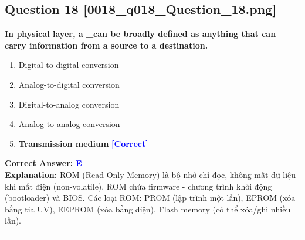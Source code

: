 \documentclass[11pt,a4paper]{article}
\begin{document}
\begin{minipage}{\textwidth}
\subsection*{Question 18 \quad \footnotesize{[0018\_q018\_Question\_18.png]}}
\noindent \textbf{In physical layer, a \_can be broadly defined as anything that can carry information from a source to a destination.}

\begin{enumerate}[label=\Alph*.]
    \item Digital-to-digital conversion
    \item Analog-to-digital conversion
    \item Digital-to-analog conversion
    \item Analog-to-analog conversion
    \item \textbf{Transmission medium} \hfill \textcolor{blue}{\textbf{[Correct]}}
\end{enumerate}

\noindent \textbf{Correct Answer:} \textcolor{blue}{\textbf{E}} \\[2pt]
\noindent \textbf{Explanation:} ROM (Read-Only Memory) là bộ nhớ chỉ đọc, không mất dữ liệu khi mất điện (non-volatile). ROM chứa firmware - chương trình khởi động (bootloader) và BIOS. Các loại ROM: PROM (lập trình một lần), EPROM (xóa bằng tia UV), EEPROM (xóa bằng điện), Flash memory (có thể xóa/ghi nhiều lần).

\par\vspace{0.3cm}
\hrule
\vspace{0.3cm}
\end{minipage}
\end{document}
